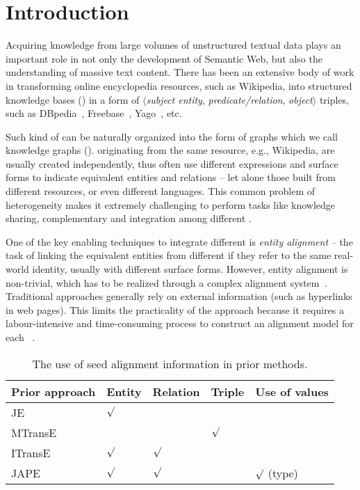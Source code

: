 	
	\section{Introduction}
	\label{section:intro}
    Acquiring knowledge from large volumes of unstructured textual data plays an important role in not only the development of Semantic
    Web, but also the understanding of massive text content. There has been an extensive body of work in transforming online encyclopedia resources, such as
    Wikipedia, into structured knowledge bases (\KBs) in a form of $\langle$\emph{subject entity},
   \emph{ predicate/relation}, \emph{object}$\rangle$ triples, such as DBpedia~\cite{Lehmann2009DBpedia,Auer2007DBpedia},
    Freebase~\cite{Bollacker2007Freebase}, Yago~\cite{Suchanek2008YAGO}, etc.
    	


	Such kind of \KBs can be naturally organized into the form of graphs which we call knowledge graphs (\KGs). \KGs originating from the
same resource, e.g., Wikipedia,  are usually created independently, thus often use different expressions and surface forms to indicate
equivalent entities and relations -- let alone those built from different resources, or even different languages. This common problem of
heterogeneity  makes it extremely challenging to perform tasks like knowledge sharing, complementary and integration among different \KGs.
	
	One of the key enabling techniques to integrate different \KGs is \emph{entity alignment} -- the task of linking the equivalent
entities from different \KGs if they refer to the same real-world identity, usually with different surface forms. However, entity alignment
is non-trivial, which  has to be realized through a complex alignment system~\cite{gokhale2014corleone,scharffe2014ontology}.
Traditional approaches generally rely on external information (such as hyperlinks in web pages). This limits the practicality of the
approach because it requires a labour-intensive and time-consuming process to construct an alignment model for each
\KG~\cite{zhu2017iterative}.


\begin{table}[t!]
	\centering
	\scriptsize
	\begin{tabular}{lllll}
		\toprule
		\bf Prior approach & \bf Entity & \bf Relation & \bf Triple & \bf Use of values \\
		\midrule
		\rowcolor{Gray} JE~\cite{hao2016joint} & ${\surd}$ & & & \\
		MTransE~\cite{chen2016multilingual} & $ $ & $ $ & ${\surd}$ & \\
		\rowcolor{Gray} ITransE~\cite{zhu2017iterative} & ${\surd}$ & ${\surd}$& & \\
		JAPE~\cite{sun2017cross} & ${\surd}$& ${\surd}$& & ${\surd}$ (type)\\
		\bottomrule
	\end{tabular}
	\caption{\small The use of seed alignment information in prior methods.}
	\label{seed}
\end{table}
	
